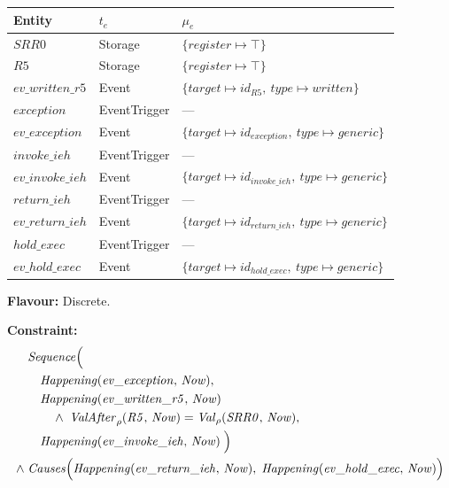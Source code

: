 \medskip
\begin{center}
\begin{tabular}{lll}
    \toprule
    \textbf{Entity} & $t_e$ & $\mu_e$ \\
    \midrule
    $\mathit{SRR0}$ & Storage & $\{\mathit{register} \mapsto \top\}$ \\
    $\mathit{R5}$ & Storage & $\{\mathit{register} \mapsto \top\}$ \\
    $\mathit{ev\_written\_r5}$ & Event & $\{\mathit{target} \mapsto id_{\mathit{R5}},\ \mathit{type} \mapsto \mathit{written}\}$ \\
    $\mathit{exception}$ & EventTrigger & --- \\
    $\mathit{ev\_exception}$ & Event & $\{\mathit{target} \mapsto id_{\mathit{exception}},\ \mathit{type} \mapsto \mathit{generic}\}$ \\
    $\mathit{invoke\_ieh}$ & EventTrigger & --- \\
    $\mathit{ev\_invoke\_ieh}$ & Event & $\{\mathit{target} \mapsto id_{\mathit{invoke\_ieh}},\ \mathit{type} \mapsto \mathit{generic}\}$ \\
    $\mathit{return\_ieh}$ & EventTrigger & --- \\
    $\mathit{ev\_return\_ieh}$ & Event & $\{\mathit{target} \mapsto id_{\mathit{return\_ieh}},\ \mathit{type} \mapsto \mathit{generic}\}$ \\
    $\mathit{hold\_exec}$ & EventTrigger & --- \\
    $\mathit{ev\_hold\_exec}$ & Event & $\{\mathit{target} \mapsto id_{\mathit{hold\_exec}},\ \mathit{type} \mapsto \mathit{generic}\}$ \\
    \bottomrule
\end{tabular}
\end{center}

\textbf{Flavour:} Discrete.

\textbf{Constraint:}
\begin{align*}
    &\mathit{Sequence}\Bigl( \\
    &\quad \mathit{Happening}(\mathit{ev\_exception},\, \mathit{Now}), \\
    &\quad \mathit{Happening}(\mathit{ev\_written\_r5},\, \mathit{Now}) \\
    &\qquad \land\; \mathit{ValAfter}_\rho(\mathit{R5},\, \mathit{Now}) = \mathit{Val}_\rho(\mathit{SRR0},\, \mathit{Now}), \\
    &\quad \mathit{Happening}(\mathit{ev\_invoke\_ieh},\, \mathit{Now})
    \;\Bigr) \\
    \land\; &\mathit{Causes}\Bigl(
        \mathit{Happening}(\mathit{ev\_return\_ieh},\, \mathit{Now}),\;
        \mathit{Happening}(\mathit{ev\_hold\_exec},\, \mathit{Now})
    \Bigr)
\end{align*}

